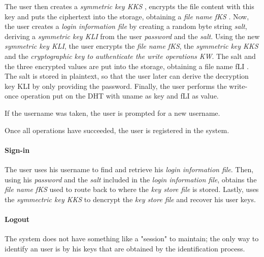 The user then creates a \textit{symmetric key KKS} ,
encrypts the file content with this key and puts the ciphertext
into the storage, obtaining a \textit{file name fKS} . Now, the user
creates a \textit{login information file} by creating a random
byte string \textit{salt}, deriving a \textit{symmetric key KLI} from the user
\textit{password} and the \textit{salt}.
Using the new \textit{ symmetric key KLI}, the user encrypts the \textit{file name fKS},
the \textit{symmetric key KKS} and the \textit{cryptographic key to
authenticate the write operations KW}.
 The salt and the three encrypted values are put
into the storage, obtaining a file name fLI . The salt is stored
in plaintext, so that the user later can derive the decryption
key KLI by only providing the password. Finally, the user
performs the write-once operation put on the DHT with
uname as key and fLI as value.

If the username was taken,
the user is prompted for a new username.

Once all operations
have succeeded, the user is registered in the system.


\paragraph{Sign-in}
The user uses his username to find and retrieve his \textit{login information
file}. Then, using his \textit{password} and the \textit{salt} included in the
\textit{login information file}, obtains the \textit{file name fKS} used to
route back to where the \textit{key store file} is stored.  Lastly, uses the
\textit{symmectric key KKS} to dencrypt the \textit{key store file} and recover
his user keys.

\paragraph{Logout}
The system does not have something like a "session" to maintain; the only way
to identify an user is by his keys that are obtained by the identification
process.

